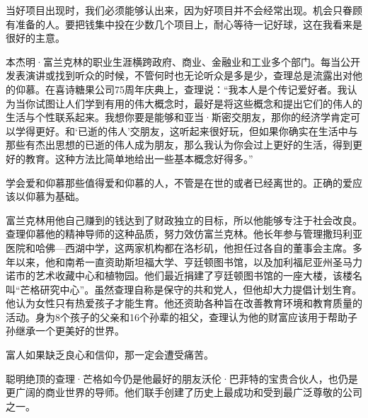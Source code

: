 \begin{WisdomBox}
\par

当好项目出现时，我们必须能够认出来，因为好项目并不会经常出现。机会只眷顾有准备的人。要把钱集中投在少数几个项目上，耐心等待一记好球，这在我看来是很好的主意。
\par
\end{WisdomBox}

本杰明·富兰克林的职业生涯横跨政府、商业、金融业和工业多个部门。每当公开发表演讲或找到听众的时候，不管何时也无论听众是多是少，查理总是流露出对他的仰慕。在喜诗糖果公司75周年庆典上，查理说：“我本人是个传记爱好者。我认为当你试图让人们学到有用的伟大概念时，最好是将这些概念和提出它们的伟人的生活与个性联系起来。我想你要是能够和亚当·斯密交朋友，那你的经济学肯定可以学得更好。和‘已逝的伟人’交朋友，这听起来很好玩，但如果你确实在生活中与那些有杰出思想的已逝的伟人成为朋友，那么我认为你会过上更好的生活，得到更好的教育。这种方法比简单地给出一些基本概念好得多。”
\par

\begin{WisdomBox}
\par

学会爱和仰慕那些值得爱和仰慕的人，不管是在世的或者已经离世的。正确的爱应该以仰慕为基础。
\par
\end{WisdomBox}

富兰克林用他自己赚到的钱达到了财政独立的目标，所以他能够专注于社会改良。查理仰慕他的精神导师的这种品质，努力效仿富兰克林。他长年参与管理撒玛利亚医院和哈佛—西湖中学，这两家机构都在洛杉矶，他担任过各自的董事会主席。多年以来，他和南希一直资助斯坦福大学、亨廷顿图书馆，以及加利福尼亚州圣马力诺市的艺术收藏中心和植物园。他们最近捐建了亨廷顿图书馆的一座大楼，该楼名叫“芒格研究中心”。虽然查理自称是保守的共和党人，但他却大力提倡计划生育。他认为女性只有热爱孩子才能生育。他还资助各种旨在改善教育环境和教育质量的活动。身为8个孩子的父亲和16个孙辈的祖父，查理认为他的财富应该用于帮助子孙继承一个更美好的世界。
\par

\begin{WisdomBox}
\par

富人如果缺乏良心和信仰，那一定会遭受痛苦。
\par
\end{WisdomBox}

聪明绝顶的查理·芒格如今仍是他最好的朋友沃伦·巴菲特的宝贵合伙人，也仍是更广阔的商业世界的导师。他们联手创建了历史上最成功和受到最广泛尊敬的公司之一。
\par
